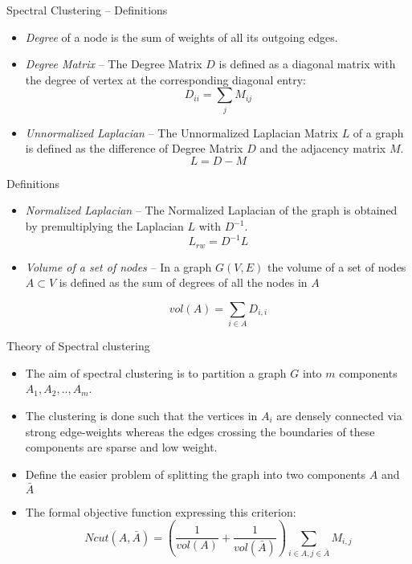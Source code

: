 \documentclass{beamer}
\begin{document}
\begin{frame}{Spectral Clustering -- Definitions}
\begin{itemize}
  \item {\it Degree} of a node is the sum of weights of all its
    outgoing edges.
  \item {\it Degree Matrix} -- The Degree Matrix $D$ is defined as a
    diagonal matrix with the degree of vertex at the corresponding
    diagonal entry:
$$
D_{ii} = \sum_j M_{ij}
$$
\item {\it Unnormalized Laplacian} -- The Unnormalized Laplacian
  Matrix $L$ of a graph is defined as the difference of Degree Matrix
  $D$ and the adjacency matrix $M$.
$$
L = D - M
$$
\end{itemize}
\end{frame}
\begin{frame}{Definitions}
\begin{itemize}
\item {\it Normalized Laplacian} -- The Normalized Laplacian of the
  graph is obtained by premultiplying the Laplacian $L$ with $D^{-1}$.
$$
L_{rw} = D^{-1} L
$$
\item {\it Volume of a set of nodes} -- In a graph $G(V,E)$ the volume
  of a set of nodes $A \subset V$ is defined as the sum of degrees of
  all the nodes in $A$

$$
vol(A) = \sum_{i \in A} D_{i,i}
$$
\end{itemize}
\end{frame}

\begin{frame}{Theory of Spectral clustering}
\begin{itemize}
\item The aim of spectral clustering is to partition a graph $G$ into
  $m$ components $A_1,A_2,..,A_m$.
\item The clustering is done such that the vertices in $A_i$ are
  densely connected via strong edge-weights whereas the edges crossing
  the boundaries of these components are sparse and low weight.
\item Define the easier problem of splitting the graph into
  two components $A$ and $\bar{A}$ 
\item The formal objective function expressing this criterion:
$$
Ncut(A,\bar{A}) = \left(\frac{1}{vol(A)} + \frac{1}{vol(\bar{A})}\right) \sum_{i \in A, j
  \in \bar{A}} M_{i,j}
$$
\end{itemize}
\end{frame}
\end{document}
